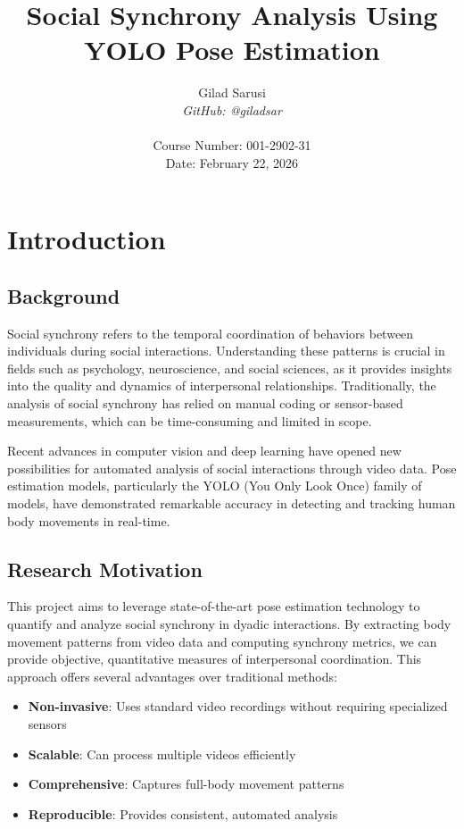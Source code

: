 \documentclass[11pt]{article}
\title{\textbf{Social Synchrony Analysis Using YOLO Pose Estimation}}
\author{
    Gilad Sarusi \\
    \textit{GitHub: @giladsar} \\
    \\
    Course Number: 001-2902-31 \\
    Date: February 22, 2026
}
\date{}
\begin{document}
\maketitle
\thispagestyle{empty}
\newpage

\setcounter{page}{1}

\section{Introduction}

\subsection{Background}
Social synchrony refers to the temporal coordination of behaviors between individuals during social interactions. Understanding these patterns is crucial in fields such as psychology, neuroscience, and social sciences, as it provides insights into the quality and dynamics of interpersonal relationships. Traditionally, the analysis of social synchrony has relied on manual coding or sensor-based measurements, which can be time-consuming and limited in scope.

Recent advances in computer vision and deep learning have opened new possibilities for automated analysis of social interactions through video data. Pose estimation models, particularly the YOLO (You Only Look Once) family of models, have demonstrated remarkable accuracy in detecting and tracking human body movements in real-time.

\subsection{Research Motivation}
This project aims to leverage state-of-the-art pose estimation technology to quantify and analyze social synchrony in dyadic interactions. By extracting body movement patterns from video data and computing synchrony metrics, we can provide objective, quantitative measures of interpersonal coordination. This approach offers several advantages over traditional methods:

\begin{itemize}
    \item \textbf{Non-invasive}: Uses standard video recordings without requiring specialized sensors
    \item \textbf{Scalable}: Can process multiple videos efficiently
    \item \textbf{Comprehensive}: Captures full-body movement patterns
    \item \textbf{Reproducible}: Provides consistent, automated analysis
\end{itemize}
\end{document}
